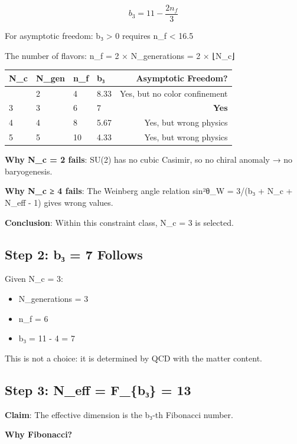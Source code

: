 \documentclass[
  11pt,
  letterpaper,
  twoside,
  openany]{book}
\makeatletter
\providecommand{\tightlist}{%
  \setlength{\itemsep}{0pt}\setlength{\parskip}{0pt}}
\let\orig@subsection\subsection
\renewcommand{\subsection}{\needspace{6\baselineskip}\orig@subsection}
\makeatother
\begin{document}
\[b_3 = 11 - \frac{2n_f}{3}\]

For asymptotic freedom: b₃ \textgreater{} 0 requires n\_f \textless{}
16.5

The number of flavors: n\_f = 2 × N\_generations = 2 × ⌊N\_c⌋

\begin{longtable}[]{@{}llllr@{}}
\toprule\noalign{}
N\_c & N\_gen & n\_f & b₃ & Asymptotic Freedom? \\
\midrule\noalign{}
\endhead
\bottomrule\noalign{}
\endlastfoot
2 & 2 & 4 & 8.33 & Yes, but no color confinement \\
3 & 3 & 6 & 7 & \textbf{Yes} \\
4 & 4 & 8 & 5.67 & Yes, but wrong physics \\
5 & 5 & 10 & 4.33 & Yes, but wrong physics \\
\end{longtable}

\textbf{Why N\_c = 2 fails}: SU(2) has no cubic Casimir, so no chiral
anomaly → no baryogenesis.

\textbf{Why N\_c ≥ 4 fails}: The Weinberg angle relation sin²θ\_W =
3/(b₃ + N\_c + N\_eff - 1) gives wrong values.

\textbf{Conclusion}: Within this constraint class, N\_c = 3 is selected.

\subsection{Step 2: b₃ = 7 Follows}\label{step-2-bux2083-7-follows}

Given N\_c = 3:

\begin{itemize}
\tightlist
\item
  N\_generations = 3
\item
  n\_f = 6
\item
  b₃ = 11 - 4 = 7
\end{itemize}

This is not a choice: it is determined by QCD with the matter content.

\subsection{Step 3: N\_eff = F\_\{b₃\} =
13}\label{step-3-n_eff-f_bux2083-13}

\textbf{Claim}: The effective dimension is the b₃-th Fibonacci number.

\textbf{Why Fibonacci?}
\end{document}
